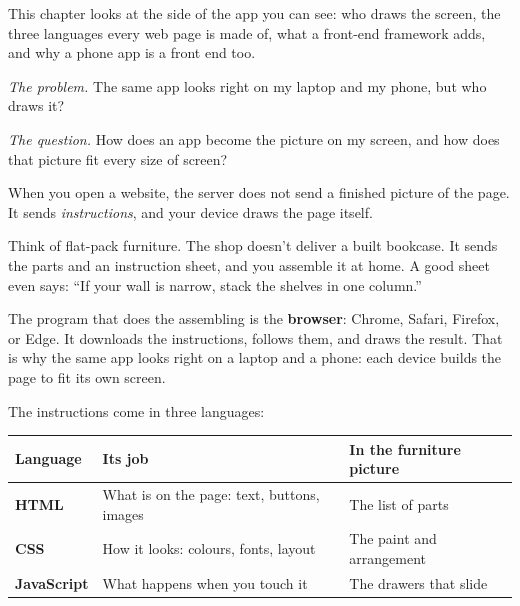 \label{ch:webapp-02}

\chapterrule

This chapter looks at the side of the app you can see: who draws the screen, the three languages every web page is made of, what a front-end framework adds, and why a phone app is a front end too.

\emph{The problem.} The same app looks right on my laptop and my phone, but who draws it?

\emph{The question.} How does an app become the picture on my screen, and how does that picture fit every size of screen?

\label{webapp-02:the-server-sends-instructions-not-a-picture}

When you open a website, the server does not send a finished picture of the page. It sends \emph{instructions}, and your device draws the page itself.

Think of flat-pack furniture. The shop doesn't deliver a built bookcase. It sends the parts and an instruction sheet, and you assemble it at home. A good sheet even says: ``If your wall is narrow, stack the shelves in one column.''

The program that does the assembling is the \textbf{browser}: Chrome, Safari, Firefox, or Edge. It downloads the instructions, follows them, and draws the result. That is why the same app looks right on a laptop and a phone: each device builds the page to fit its own screen.

\label{webapp-02:three-languages-three-jobs}

The instructions come in three languages:


{\def\LTcaptype{none} %
\begin{longtable}[]{@{}
  >{\raggedright\arraybackslash}p{}
  >{\raggedright\arraybackslash}p{}
  >{\raggedright\arraybackslash}p{}@{}}
\toprule\noalign{}
\begin{minipage}[b]{\linewidth}\raggedright
Language
\end{minipage} & \begin{minipage}[b]{\linewidth}\raggedright
Its job
\end{minipage} & \begin{minipage}[b]{\linewidth}\raggedright
In the furniture picture
\end{minipage} \\
\midrule\noalign{}
\endhead
\bottomrule\noalign{}
\endlastfoot
\textbf{HTML} & What is on the page: text, buttons, images & The list of parts \\
\textbf{CSS} & How it looks: colours, fonts, layout & The paint and arrangement \\
\textbf{JavaScript} & What happens when you touch it & The drawers that slide \\
\end{longtable}
}

